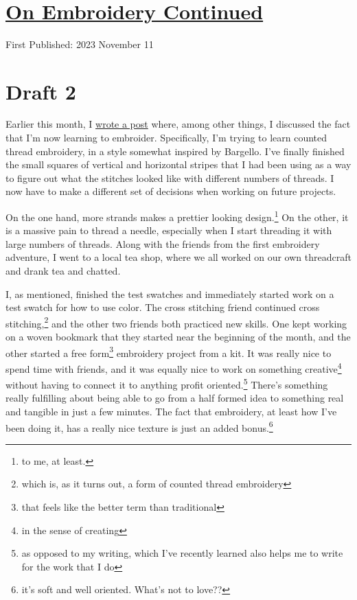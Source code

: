 \documentclass[12pt]{article}[titlepage]
\newcommand{\1}{\={a}}
\newcommand{\2}{\={e}}
\newcommand{\3}{\={\i}}
\newcommand{\4}{\=o}
\newcommand{\5}{\=u}
\newcommand{\6}{\={A}}
\renewcommand{\,}{\textsuperscript{,}}
\begin{document}

\doublespacing
\section{\href{embroidery-2.html}{On Embroidery Continued}}
First Published: 2023 November 11

\section{Draft 2}
Earlier this month, I \href{embroidery.html}{wrote a post} where, among other things, I discussed the fact that I'm now learning to embroider.
Specifically, I'm trying to learn counted thread embroidery, in a style somewhat inspired by Bargello.
I've finally finished the small squares of vertical and horizontal stripes that I had been using as a way to figure out what the stitches looked like with different numbers of threads.
I now have to make a different set of decisions when working on future projects.

On the one hand, more strands makes a prettier looking design.\footnote{to me, at least.}
On the other, it is a massive pain to thread a needle, especially when I start threading it with large numbers of threads.
Along with the friends from the first embroidery adventure, I went to a local tea shop, where we all worked on our own threadcraft and drank tea and chatted.

I, as mentioned, finished the test swatches and immediately started work on a test swatch for how to use color.
The cross stitching friend continued cross stitching,\footnote{which is, as it turns out, a form of counted thread embroidery} and the other two friends both practiced new skills.
One kept working on a woven bookmark that they started near the beginning of the month, and the other started a free form\footnote{that feels like the better term than traditional} embroidery project from a kit.
It was really nice to spend time with friends, and it was equally nice to work on something creative\footnote{in the sense of creating} without having to connect it to anything profit oriented.\footnote{as opposed to my writing, which I've recently learned also helps me to write for the work that I do}
There's something really fulfilling about being able to go from a half formed idea to something real and tangible in just a few minutes.
The fact that embroidery, at least how I've been doing it, has a really nice texture is just an added bonus.\footnote{it's soft and well oriented. What's not to love??}
\end{document}
